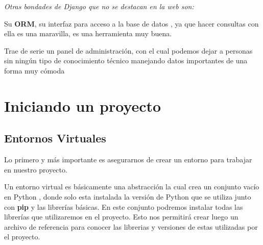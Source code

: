 \documentclass[10pt]{article}
\newcommand{\py}[1]{{\textcolor{B}{Python} #1}}
\newcommand{\django}[2]{{\textcolor{G}{Django} #2}}
\begin{document}
\textit{Otras bondades de \django{} que no se destacan en la web son:}

Su \textbf{ORM}, su interfaz para acceso a la base de datos , ya que hacer consultas con ella es una maravilla, es una herramienta muy buena.

Trae de serie un panel de administración, con el cual podemos dejar a personas sin ningún tipo de conocimiento técnico manejando datos importantes de una forma muy cómoda


\section{Iniciando un proyecto}
\subsection{Entornos Virtuales}
Lo primero y más importante es asegurarnos de crear un entorno para trabajar en nuestro proyecto.

Un entorno virtual es básicamente una abstracción la cual crea un conjunto vacío en \py{}, donde solo esta instalada la versión de \py{} que se utiliza junto con \textbf{pip} y las librerías básicas. En este conjunto podremos instalar todas las librerías que utilizaremos en el proyecto. Esto nos permitirá crear luego un archivo de referencia para conocer las librerias y versiones de estas utilizadas por el proyecto. 
\end{document}
